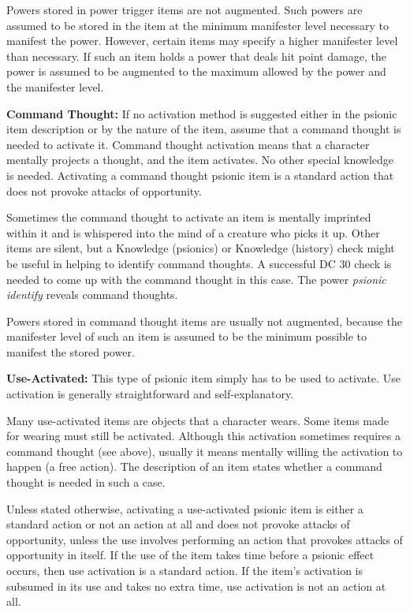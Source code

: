 \documentclass{article}
\begin{document}
Powers stored in power trigger items are not augmented. Such powers are assumed 
to be stored in the item at the minimum manifester level necessary to manifest 
the power. However, certain items may specify a higher manifester level than necessary. 
If such an item holds a power that deals hit point damage, the power is assumed 
to be augmented to the maximum allowed by the power and the manifester level.

\textbf{Command Thought:} If no activation method is suggested either in the psionic 
item description or by the nature of the item, assume that a command thought is 
needed to activate it. Command thought activation means that a character mentally 
projects a thought, and the item activates. No other special knowledge is needed. 
Activating a command thought psionic item is a standard action that does not provoke 
attacks of opportunity. 

Sometimes the command thought to activate an item is mentally imprinted within 
it and is whispered into the mind of a creature who picks it up. Other items are 
silent, but a Knowledge (psionics) or Knowledge (history) check might be useful 
in helping to identify command thoughts. A successful DC 30 check is needed to 
come up with the command thought in this case. The power \textit{psionic identify 
}reveals command thoughts.

Powers stored in command thought items are usually not augmented, because the manifester 
level of such an item is assumed to be the minimum possible to manifest the stored 
power.

\textbf{Use-Activated: }This type of psionic item simply has to be used to activate. 
Use activation is generally straightforward and self-explanatory.

Many use-activated items are objects that a character wears. Some items made for 
wearing must still be activated. Although this activation sometimes requires a 
command thought (see above), usually it means mentally willing the activation to 
happen  (a free action). The description of an item states whether a command thought 
is needed in such a case.

Unless stated otherwise, activating a use-activated psionic item is either a standard 
action or not an action at all and does not provoke attacks of opportunity, unless 
the use involves performing an action that provokes attacks of opportunity in itself. 
If the use of the item takes time before a psionic effect occurs, then use activation 
is a standard action. If the item's activation is subsumed in its use and takes 
no extra time, use activation is not an action at all.
\end{document}
